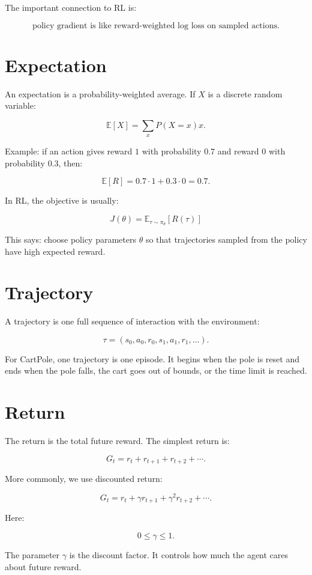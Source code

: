 \documentclass[11pt]{article}
\begin{document}
The important connection to RL is:

\[
\boxed{
\text{policy gradient is like reward-weighted log loss on sampled actions.}
}
\]

\section{Expectation}

An expectation is a probability-weighted average.
If $X$ is a discrete random variable:

\[
\mathbb{E}[X]
=
\sum_x P(X=x)x.
\]

Example:
if an action gives reward $1$ with probability $0.7$ and reward $0$ with probability $0.3$, then:

\[
\mathbb{E}[R]
=
0.7 \cdot 1 + 0.3 \cdot 0
=
0.7.
\]

In RL, the objective is usually:

\[
\boxed{
J(\theta) = \mathbb{E}_{\tau \sim \pi_\theta}[R(\tau)]
}
\]

This says:
choose policy parameters $\theta$ so that trajectories sampled from the policy have high expected reward.

\section{Trajectory}

A trajectory is one full sequence of interaction with the environment:

\[
\tau = (s_0, a_0, r_0, s_1, a_1, r_1, \ldots).
\]

For CartPole, one trajectory is one episode.
It begins when the pole is reset and ends when the pole falls, the cart goes out of bounds, or the time limit is reached.

\section{Return}

The return is the total future reward.
The simplest return is:

\[
G_t = r_t + r_{t+1} + r_{t+2} + \cdots.
\]

More commonly, we use discounted return:

\[
G_t
=
r_t + \gamma r_{t+1} + \gamma^2 r_{t+2} + \cdots.
\]

Here:

\[
0 \leq \gamma \leq 1.
\]

The parameter $\gamma$ is the discount factor.
It controls how much the agent cares about future reward.
\end{document}
